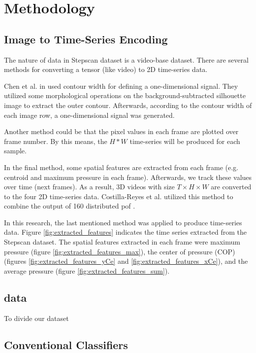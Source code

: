 
\section{Methodology}
\subsection{Image to Time-Series Encoding}
The nature of data in Stepscan dataset is a video-base dataset. There are several methods for converting a tensor (like video) to 2D time-series data. 

Chen et al. in \cite{Chen2006GaitModel} used contour width for defining a one-dimensional signal. They utilized some morphological operations on the background-subtracted silhouette image to extract the outer contour. Afterwards, according to the contour width of each image row, a one-dimensional signal was generated.

Another method could be that the pixel values in each frame are plotted over frame number. By this means, the $H * W$ time-series will be produced for each sample.

In the final method, some spatial features are extracted from each frame (e.g. centroid and maximum pressure in each frame). Afterwards, we track these values over time (next frames). As a result, 3D videos with size $T \times H \times W$ are converted to the four 2D time-series data. Costilla-Reyes et al. utilized this method to combine the output of 160 distributed \acrshort{pof} \cite{Costilla-Reyes2018DeepSensors}.

In this research, the last mentioned method was applied to produce time-series data. Figure \ref{fig:extracted_features} indicates the time series extracted from the Stepscan dataset. The spatial features extracted in each frame were maximum pressure (figure \ref{fig:extracted_features_max}), the center of pressure (COP) (figures \ref{fig:extracted_features_yCe} and \ref{fig:extracted_features_xCe}), and the average pressure (figure \ref{fig:extracted_features_sum}). 

\subsection{data }
To divide our dataset 


\subsection{Conventional Classifiers}

